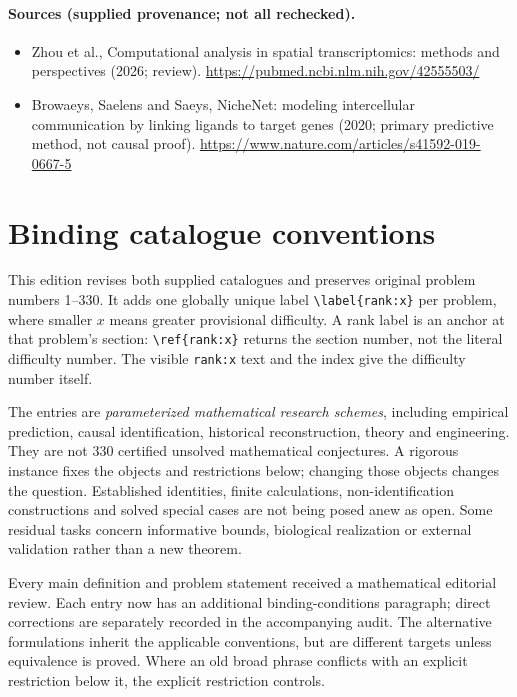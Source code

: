 \documentclass[11pt]{article}
\begin{document}
\paragraph{Sources (supplied provenance; not all rechecked).}
\begin{itemize}
\item Zhou et al., Computational analysis in spatial transcriptomics: methods and perspectives (2026; review). \url{https://pubmed.ncbi.nlm.nih.gov/42555503/}
\item Browaeys, Saelens and Saeys, NicheNet: modeling intercellular communication by linking ligands to target genes (2020; primary predictive method, not causal proof). \url{https://www.nature.com/articles/s41592-019-0667-5}
\end{itemize}


\section*{Binding catalogue conventions}
This edition revises both supplied catalogues and preserves original problem numbers 1--330. It adds one globally unique label \verb|\label{rank:x}| per problem, where smaller $x$ means greater provisional difficulty. A rank label is an anchor at that problem's section: \verb|\ref{rank:x}| returns the section number, not the literal difficulty number. The visible \texttt{rank:x} text and the index give the difficulty number itself.

The entries are \emph{parameterized mathematical research schemes}, including empirical prediction, causal identification, historical reconstruction, theory and engineering. They are not 330 certified unsolved mathematical conjectures. A rigorous instance fixes the objects and restrictions below; changing those objects changes the question. Established identities, finite calculations, non-identification constructions and solved special cases are not being posed anew as open. Some residual tasks concern informative bounds, biological realization or external validation rather than a new theorem.

Every main definition and problem statement received a mathematical editorial review. Each entry now has an additional binding-conditions paragraph; direct corrections are separately recorded in the accompanying audit. The alternative formulations inherit the applicable conventions, but are different targets unless equivalence is proved. Where an old broad phrase conflicts with an explicit restriction below it, the explicit restriction controls.
\end{document}
